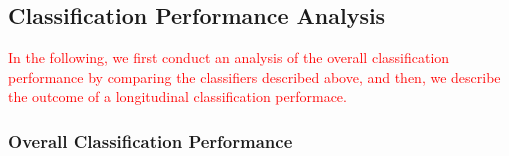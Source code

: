 



\subsection*{Classification Performance Analysis}
\textcolor{red}{In the following, we first conduct an analysis of the overall classification performance by comparing the classifiers described above, and then, we describe the outcome of a longitudinal classification performace.}

\subsubsection*{Overall Classification Performance}


